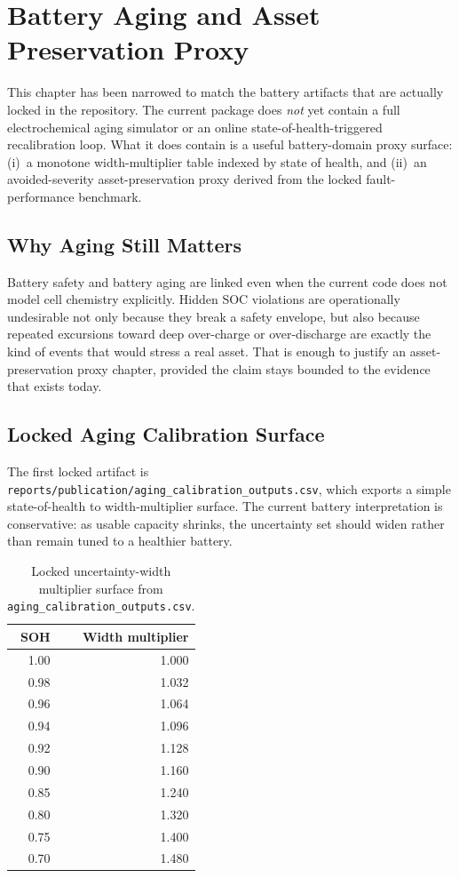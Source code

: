 
\chapter{Battery Aging and Asset Preservation Proxy}
\label{ch:aging}

This chapter has been narrowed to match the battery artifacts that are
actually locked in the repository.  The current package does \emph{not}
yet contain a full electrochemical aging simulator or an online
state-of-health-triggered recalibration loop.  What it does contain is a
useful battery-domain proxy surface: (i)~a monotone width-multiplier table
indexed by state of health, and (ii)~an avoided-severity asset-preservation
proxy derived from the locked fault-performance benchmark.

\section{Why Aging Still Matters}

Battery safety and battery aging are linked even when the current code
does not model cell chemistry explicitly.  Hidden SOC violations are
operationally undesirable not only because they break a safety envelope,
but also because repeated excursions toward deep over-charge or
over-discharge are exactly the kind of events that would stress a real
asset.  That is enough to justify an asset-preservation proxy chapter,
provided the claim stays bounded to the evidence that exists today.

\section{Locked Aging Calibration Surface}

The first locked artifact is
\texttt{reports/publication/aging\_calibration\_outputs.csv}, which exports a
simple state-of-health to width-multiplier surface.  The current battery
interpretation is conservative: as usable capacity shrinks, the uncertainty
set should widen rather than remain tuned to a healthier battery.

\begin{table}[ht]
\centering
\caption{Locked uncertainty-width multiplier surface from
  \texttt{aging\_calibration\_outputs.csv}.}
\label{tab:aging-multiplier}
\begin{tabular}{rr}
\toprule
\textbf{SOH} & \textbf{Width multiplier} \\
\midrule
1.00 & 1.000 \\
0.98 & 1.032 \\
0.96 & 1.064 \\
0.94 & 1.096 \\
0.92 & 1.128 \\
0.90 & 1.160 \\
0.85 & 1.240 \\
0.80 & 1.320 \\
0.75 & 1.400 \\
0.70 & 1.480 \\
\bottomrule
\end{tabular}
\end{table}


